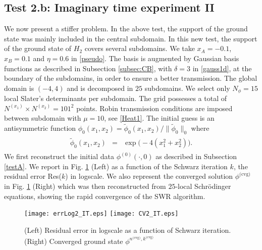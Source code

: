 \subsection{Test 2.b: Imaginary time experiment II}
We now present a stiffer problem. In the above test, the support of the ground state was mainly included in the central subdomain. In this new test, the support of the ground state of $H_2$ covers several subdomains. We take $x_A=-0.1$, $x_B=0.1$ and $\eta=0.6$ in \eqref{pseudo}. The basis is augmented by Gaussian basis functions as described in Subsection \ref{subsec:CB}, with $\delta=3$ in \eqref{gauss1d}, at the boundary of the subdomains, in order to ensure a better transmission. The global domain is $(-4,4)$ and is decomposed in $25$ subdomains. We select only $N_{\phi}=15$ local Slater's determinants per subdomain. The grid possesses a total of $N^{(x_1)}\times N^{(x_2)}=101^2$ points. Robin transmission conditions are imposed between subdomain with $\mu=10$, see \eqref{Heat1}.  The initial guess is an antisymmetric function $\phi_0(x_1,x_2)=\widetilde{\phi}_0(x_1,x_2)/\|\widetilde{\phi}_0\|_{0}$ where
\begin{eqnarray*}
\left.
\begin{array}{lcl}
\widetilde{\phi}_0(x_1,x_2) & =  & \exp\big(-4(x_1^2+x_2^2)\big).
\end{array}
\right.
\end{eqnarray*}
We first reconstruct the initial data $\phi^{(0)}(\cdot,0)$ as described in Subsection \ref{testA}. We report in Fig. \ref{CV2_IT} (Left) as a function of the Schwarz iteration $k$, the residual error Res($k$) in logscale. We also represent the converged solution $\phi^{\textrm{(cvg)}}$ in Fig. \ref{CV2_IT} (Right) which was then reconstructed from $25$-local Schr\"odinger equations, showing the rapid convergence of the SWR algorithm.
\begin{figure}[!ht]
\begin{center}
\hspace*{1mm}\texttt{[image: errLog2\_IT.eps]}
\hspace*{1mm}\texttt{[image: CV2\_IT.eps]}
\caption{(Left)  Residual error in logscale as a function of Schwarz iteration. (Right) Converged ground state $\phi^{n^{\textrm{(cvg)}},k^\textrm{(cvg)}}$}
\label{CV2_IT}
\end{center}
\end{figure}
